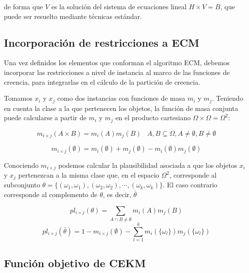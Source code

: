 de forma que $V$ es la solución del sistema de ecuaciones lineal $H\times V = B$, que puede ser resuelto mediante técnicas estándar.

\subsection{Incorporación de restricciones a ECM}

Una vez definidos los elementos que conforman el algoritmo ECM, debemos incorporar las restricciones a nivel de instancia al marco de las funciones de creencia, para integrarlas en el cálculo de la partición de creencia.

Tomamos $x_i$ y $x_j$ como dos instancias con funciones de masa $m_i$ y $m_j$. Teniendo en cuenta la clase a la que pertenecen los objetos, la función de masa conjunta puede calcularse a partir de $m_i$ y $m_j$ en el producto cartesiano $\Omega \times \Omega = \Omega^2$:

\begin{equation}
m_{i \times j}(A \times B) = m_i(A)m_j(B) \;\;\; A,B \subseteq \Omega, A \neq \emptyset, B \neq \emptyset
\label{eqn21}
\end{equation}

\begin{equation}
m_{i \times j}(\emptyset) = m_i(\emptyset) + m_j(\emptyset) - m_i(\emptyset)m_j(\emptyset)
\label{eqn22}
\end{equation}

Conociendo $ m_{i \times j} $ podemos calcular la plausibilidad asociada a que los objetos $x_i$ y $x_j$ pertenezcan a la misma clase que, en el espacio $\Omega^2$, corresponde al subconjunto $\theta = \{(\omega_1, \omega_1), (\omega_2, \omega_2), \cdots, (\omega_k, \omega_k)\}$. El caso contrario corresponde al complemento de $\theta$, es decir, $\bar{\theta}$

\begin{equation}
pl_{i\times j}(\theta) = \sum_{A \cap B \ne \emptyset}m_i(A)m_j(B)
\label{eqn23}
\end{equation}
\begin{equation}
pl_{i\times j}(\bar{\theta}) = 1 - m_{i\times j}(\emptyset) - \sum_{l=1}^{k} m_i(\{\omega_l\})m_j(\{\omega_l\})
\label{eqn24}
\end{equation}

\subsection{Función objetivo de CEKM}

